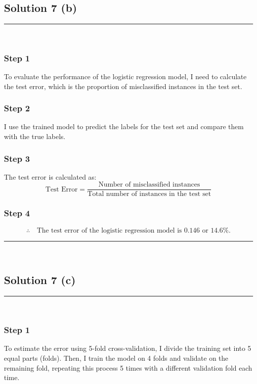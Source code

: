 \documentclass{article}
\begin{document}
\newpage

\subsection*{Solution 7 (b)}
\noindent\rule{\textwidth}{0.4pt}\\

\subsubsection*{Step 1}
\parbox{\textwidth}{
To evaluate the performance of the logistic regression model, I need to calculate the test error, which is the proportion of misclassified instances in the test set.
}

\subsubsection*{Step 2}
\parbox{\textwidth}{
I use the trained model to predict the labels for the test set and compare them with the true labels.
}

\subsubsection*{Step 3}
\parbox{\textwidth}{
The test error is calculated as:
\[
\text{Test Error} = \frac{\text{Number of misclassified instances}}{\text{Total number of instances in the test set}}
\]
}

\subsubsection*{Step 4}
\parbox{\textwidth}{
\[
\therefore \quad \text{The test error of the logistic regression model is } 0.146 \text{ or } 14.6\%.
\]
}

\noindent\rule{\textwidth}{0.4pt}\\

\newpage

\subsection*{Solution 7 (c)}
\noindent\rule{\textwidth}{0.4pt}\\

\subsubsection*{Step 1}
\parbox{\textwidth}{
To estimate the error using 5-fold cross-validation, I divide the training set into 5 equal parts (folds). Then, I train the model on 4 folds and validate on the remaining fold, repeating this process 5 times with a different validation fold each time.
}
\end{document}
